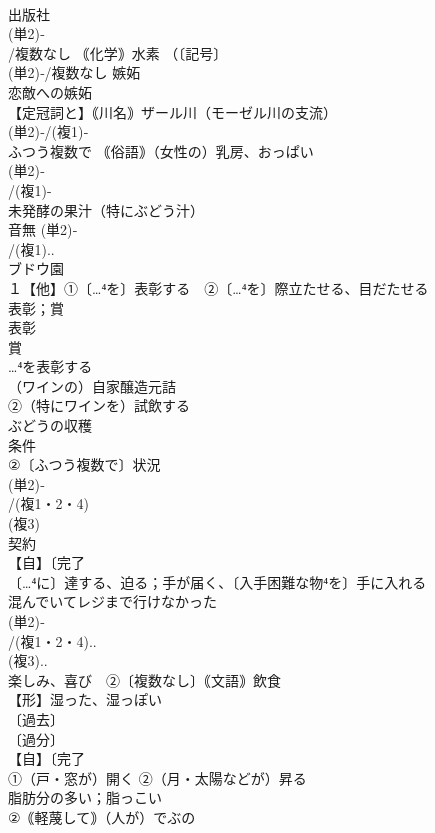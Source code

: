 \documentclass[8pt]{extreport}
\begin{document}
\begin{CJK}{UTF8}{min}
\\	出版社 
\\	(単2)‐
\\	/複数なし ｟化学｠水素 （〔記号〕
\\	(単2)‐/複数なし 嫉妬 
\\	恋敵への嫉妬
\\	【定冠詞と】｟川名｠ザール川（モーゼル川の支流）
\\	(単2)‐/(複1)‐
\\	ふつう複数で ｟俗語｠（女性の）乳房、おっぱい
\\	(単2)‐
\\	/(複1)-
\\	未発酵の果汁（特にぶどう汁） 
\\	音無	(単2)‐
\\	/(複1)..
\\	ブドウ園
\\	１【他】①〔…⁴を〕表彰する　②〔…⁴を〕際立たせる、目だたせる 
\\	表彰；賞
\\	表彰　
\\	賞 
\\	…⁴を表彰する
\\	（ワインの）自家醸造元詰
\\	②（特にワインを）試飲する
\\	ぶどうの収穫 
\\	条件 
\\	②〔ふつう複数で〕状況
\\	(単2)‐
\\	/(複1・2・4)
\\	(複3)
\\	契約
\\	【自】〔完了
\\	〔…⁴に〕達する、迫る；手が届く、〔入手困難な物⁴を〕手に入れる 
\\	混んでいてレジまで行けなかった
\\	(単2)‐
\\	/(複1・2・4)..
\\	(複3)..
\\	楽しみ、喜び　②〔複数なし〕｟文語｠飲食 
\\	【形】湿った、湿っぽい 
\\	〔過去〕
\\	〔過分〕
\\	【自】〔完了
\\	①（戸・窓が）開く ②（月・太陽などが）昇る 
\\	脂肪分の多い；脂っこい 
\\	②｟軽蔑して｠（人が）でぶの

\end{CJK}
\end{document}
